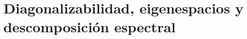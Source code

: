 \documentclass[notasLineal]{subfiles}
\begin{document}
\section{Diagonalizabilidad, eigenespacios y descomposición espectral}\label{Sec: Diagonalizabilidad, eigenespacios y descomposición espectral}
\end{document}
